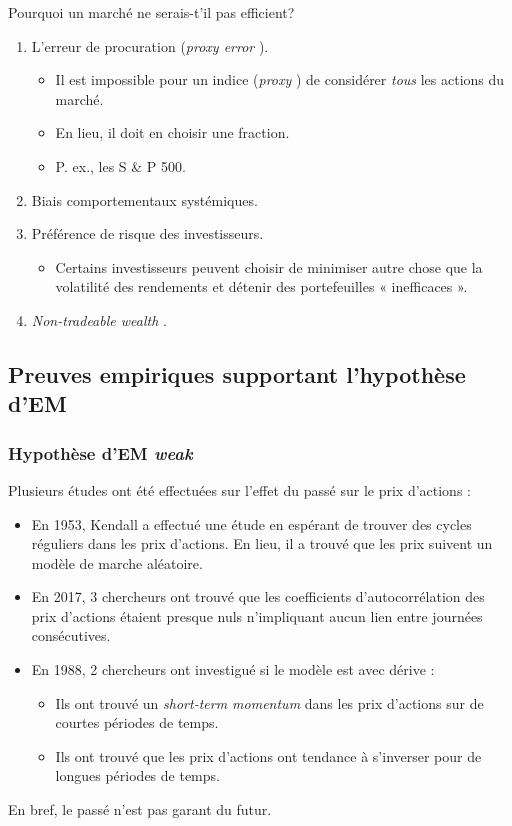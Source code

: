 \documentclass[10pt, french]{article}
\begin{document}
\begin{multicols*}{2}
\begin{conceptgen}{Pourquoi un marché ne serais-t'il pas efficient?}
\begin{enumerate}
	\item	L'erreur de procuration (\og \textit{proxy error} \fg{}).
		\begin{itemize}
		\item	Il est impossible pour un indice (\og \textit{proxy} \fg{}) de considérer \textit{tous} les actions du marché.
		\item	En lieu, il doit en choisir une fraction.
		\item	P. ex., les S \& P 500.
		\end{itemize}
	\item	Biais comportementaux systémiques.
	\item	Préférence de risque des investisseurs.
		\begin{itemize}
		\item	Certains investisseurs peuvent choisir de minimiser autre chose que la volatilité des rendements et détenir des portefeuilles « inefficaces ».
		\end{itemize}
	\item	\og \textit{Non-tradeable wealth} \fg{}.
\end{enumerate}
\end{conceptgen}


\pagebreak
\subsection{Preuves empiriques supportant l'hypothèse d'EM}
\subsubsection{Hypothèse d'EM \og \textit{weak} \fg{}}
Plusieurs études ont été effectuées sur l'effet du passé sur le prix d'actions :
\begin{itemize}
	\item	En 1953, Kendall a effectué une étude en espérant de trouver des cycles réguliers dans les prix d'actions. En lieu, il a trouvé que les prix suivent un modèle de marche aléatoire.
	\item	En 2017, 3 chercheurs ont trouvé que les coefficients d'autocorrélation des prix d'actions étaient presque nuls n’impliquant aucun lien entre journées consécutives.
	\item	En 1988, 2 chercheurs ont investigué si le modèle est avec dérive :
		\begin{itemize}
			\item	Ils ont trouvé un \og \textit{short-term momentum} \fg{} dans les prix d'actions sur de courtes périodes de temps.
			\item	Ils ont trouvé que les prix d'actions ont tendance à s'inverser pour de longues périodes de temps. 
		\end{itemize}
\end{itemize}
En bref, le passé n'est pas garant du futur. 



\end{multicols*}
\end{document}
